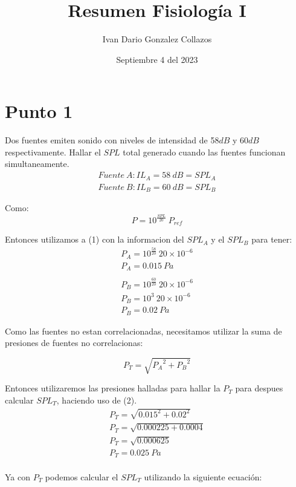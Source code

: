 \documentclass{article}
\title{Resumen Fisiología I}
\author{Ivan Dario Gonzalez Collazos}
\date{Septiembre 4 del 2023}
\begin{document}
\maketitle

\section{Punto 1}

Dos fuentes emiten sonido con niveles de intensidad de 58$dB$ y 60$dB$ respectivamente. Hallar el $SPL$ total generado cuando las fuentes funcionan simultaneamente.
\begin{gather*}
    Fuente\ A: IL_A = 58\ dB = SPL_A\\ 
    Fuente\ B: IL_B = 60\ dB = SPL_B
\end{gather*}

Como:
\begin{equation}
    P = 10^\frac{SPL}{20}\ P_{ref}
\end{equation}

Entonces utilizamos a (1) con la informacion del $SPL_A$ y el $SPL_B$ para tener:
\begin{gather*}
    P_A = 10^\frac{58}{20}\ 20 \times 10^{-6}\\
    P_A = 0.015\ Pa\\\\
    P_B = 10^\frac{60}{20}\ 20 \times 10^{-6}\\
    P_B = 10^{3}\ 20 \times 10^{-6}\\
    P_B = 0.02\ Pa
\end{gather*}

Como las fuentes no estan correlacionadas, necesitamos utilizar la suma de presiones de fuentes no correlacionas:

\begin{equation}
    P_T = \sqrt{{P_A}^2 + {P_B}^2}
\end{equation}

Entonces utilizaremos las presiones halladas para hallar la $P_T$ para despues calcular $SPL_T$, haciendo uso de (2).
\begin{gather*}
    P_T = \sqrt{0.015^2 + 0.02^2}\\
    P_T = \sqrt{0.000225 + 0.0004}\\
    P_T = \sqrt{0.000625}\\
    P_T = 0.025\ Pa\\
\end{gather*}

Ya con $P_T$ podemos calcular el $SPL_T$ utilizando la siguiente ecuación:
\end{document}
